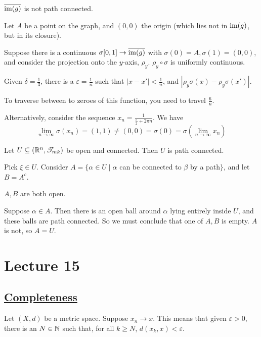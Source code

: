 \documentclass[x11names,reqno,14pt]{extarticle}
\newcommand*{\oo}{{\infty}}
\begin{document}
\claim

$\overline{\operatorname{\mathrm{im}}(g)}$ is not path connected. 

\proof

Let $A$ be a point on the graph, and $(0, 0)$ the origin (which lies not in $\operatorname{\mathrm{im}}(g)$, but in its closure). 

Suppose there is a continuous $\sigma[0, 1]\to \overline{\operatorname{\mathrm{im}}(g)}$ with $\sigma(0) = A, \sigma(1) = (0, 0)$, and consider the projection onto the $y$-axis, $\rho_y$. $\rho_y \circ \sigma$ is uniformly continuous. 

Given $\delta = \frac{1}{3}$, there is a $\varepsilon = \frac{1}{n}$ such that $|x - x'| < \frac{1}{n}$, and $|\rho_y\sigma(x) - \rho_y\sigma(x')|$. 

To traverse between to zeroes of this function, you need to travel $\frac{6}{n}$. 

Alternatively, consider the sequence $x_n = \frac{1}{\frac{\pi}{2} + 2\pi n}$. We have
\[
\lim_{n\to\oo}\sigma(x_n) = (1, 1) \neq(0, 0) = \sigma(0) = \sigma(\lim_{n\to\oo}x_n)
\]

\thm

Let $U \subseteq (\mathbb{R}^n, \mathscr{T}_{mk})$ be open and connected. Then $U$ is path connected. 

\proof

Pick $\xi \in U$. Consider $A = \{\alpha\in U \mid \alpha$ can be connected to $\beta$ by a path$\}$, and let $B = A^c$.

\claim

$A, B$ are both open.

\proof

 Suppose $\alpha \in A$. Then there is an open ball around $\alpha$ lying entirely inside $U$, and these balls are path connected. So we must conclude that one of $A, B$ is empty. $A$ is not, so $A = U$. 

\section*{Lecture 15}

\subsection*{\underline{Completeness}}

Let $(X, d)$ be a metric space. Suppose $x_n\to x$. This means that given $\varepsilon>0$, there is an $N\in\mathbb{N}$ such that, for all $k \geq N$, $d(x_k, x) < \varepsilon$. 

\end{document}
